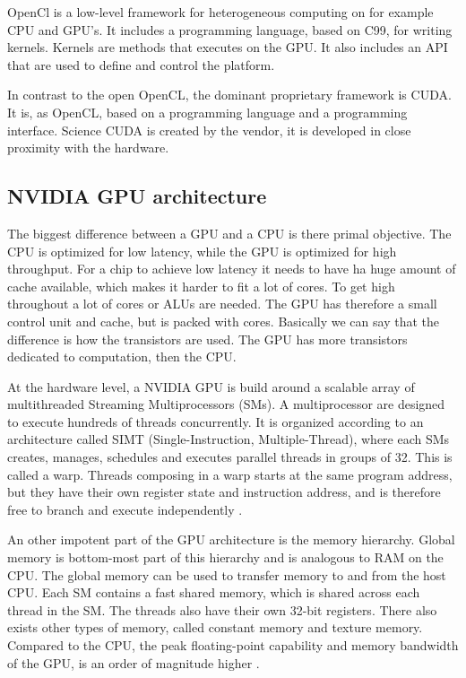 OpenCl is a low-level framework for heterogeneous computing on for example CPU and GPU's. It includes a programming language, based on C99, for writing kernels. Kernels are methods that executes on the GPU. It also includes an API that are used to define and control the platform.

In contrast to the open OpenCL, the dominant proprietary framework is CUDA. It is, as OpenCL, based on a programming language and a programming interface. Science CUDA is created by the vendor, it is developed in close proximity with the hardware.


\subsection{NVIDIA GPU architecture} %
\label{ssub:nvidia_gpu_architecture}


The biggest difference between a GPU and a CPU is there primal objective. The CPU is optimized for low latency, while the GPU is optimized for high throughput. For a chip to achieve low latency it needs to have ha huge amount of cache available, which makes it harder to fit a lot of cores. To get high throughout a lot of cores or ALUs are needed. The GPU has therefore a small control unit and cache, but is packed with cores. Basically we can say that the difference is how the transistors are used. The GPU has more transistors dedicated to computation, then the CPU.

At the hardware level, a NVIDIA GPU is build around a scalable array of multithreaded Streaming Multiprocessors (SMs). A multiprocessor are designed to execute hundreds of threads concurrently. It is organized according to an architecture called SIMT (Single-Instruction, Multiple-Thread), where each SMs creates, manages, schedules and executes parallel threads in groups of 32. This is called a warp. Threads composing in a warp starts at the same program address, but they have their own register state and instruction address, and is therefore free to branch and execute independently \citep{cuda_programming_guide}.

An other impotent part of the GPU architecture is the memory hierarchy. Global memory is bottom-most part of this hierarchy and is analogous to RAM on the CPU. The global memory can be used to transfer memory to and from the host CPU. Each SM contains a fast shared memory, which is shared across each thread in the SM. The threads also have their own 32-bit registers. There also exists other types of memory, called constant memory and texture memory. Compared to the CPU, the peak floating-point capability and memory bandwidth of the GPU, is an order of magnitude higher \citep{LiangcuKnn}.


